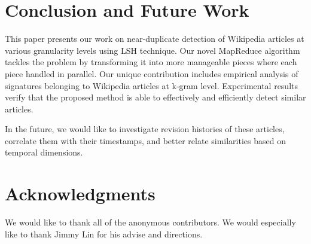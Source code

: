 \documentclass{acm_proc_article-sp}
\begin{document}
\section{Conclusion and Future Work}
This paper presents our work on near-duplicate detection of Wikipedia articles at various granularity levels using LSH technique. Our novel MapReduce algorithm tackles the problem by transforming it into more manageable pieces where each piece handled in parallel. Our unique contribution includes empirical analysis of signatures belonging to Wikipedia articles at k-gram level. Experimental results verify that the proposed method is able to effectively and efficiently detect similar articles.

In the future, we would like to investigate revision histories of these articles, correlate them with their timestamps, and better relate similarities based on temporal dimensions. 

\section{Acknowledgments}
We would like to thank all of the anonymous contributors. We would especially like to thank Jimmy Lin for his advise and directions.



\balancecolumns
\end{document}

